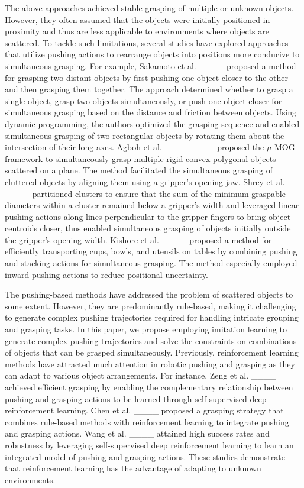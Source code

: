 The above approaches achieved stable grasping of multiple or unknown objects. However, they often assumed that the objects were initially positioned in proximity and thus are less applicable to environments where objects are scattered. To tackle such limitations, several studies have explored approaches that utilize pushing actions to rearrange objects into positions more conducive to simultaneous grasping. For example, Sakamoto et al. ____ proposed a method for grasping two distant objects by first pushing one object closer to the other and then grasping them together. The approach determined whether to grasp a single object, grasp two objects simultaneously, or push one object closer for simultaneous grasping based on the distance and friction between objects. Using dynamic programming, the authors optimized the grasping sequence and enabled simultaneous grasping of two rectangular objects by rotating them about the intersection of their long axes. Agboh et al. ________ proposed the $\mu$-MOG framework to simultaneously grasp multiple rigid convex polygonal objects scattered on a plane. The method facilitated the simultaneous grasping of cluttered objects by aligning them using a gripper's opening jaw. Shrey et al. ____ partitioned clusters to ensure that the sum of the minimum graspable diameters within a cluster remained below a gripper’s width and leveraged linear pushing actions along lines perpendicular to the gripper fingers to bring object centroids closer, thus enabled simultaneous grasping of objects initially outside the gripper's opening width. Kishore et al. ____ proposed a method for efficiently transporting cups, bowls, and utensils on tables by combining pushing and stacking actions for simultaneous grasping. The method especially employed inward-pushing actions to reduce positional uncertainty. 

The pushing-based methods have addressed the problem of scattered objects to some extent. However, they are predominantly rule-based, making it challenging to generate complex pushing trajectories required for handling intricate grouping and grasping tasks. In this paper, we propose employing imitation learning to generate complex pushing trajectories and solve the constraints on combinations of objects that can be grasped simultaneously. Previously, reinforcement learning methods have attracted much attention in robotic pushing and grasping as they can adapt to various object arrangements. For instance, Zeng et al. ____ achieved efficient grasping by enabling the complementary relationship between pushing and grasping actions to be learned through self-supervised deep reinforcement learning. Chen et al. ____ proposed a grasping strategy that combines rule-based methods with reinforcement learning to integrate pushing and grasping actions. Wang et al. ____ attained high success rates and robustness by leveraging self-supervised deep reinforcement learning to learn an integrated model of pushing and grasping actions. These studies demonstrate that reinforcement learning has the advantage of adapting to unknown environments. 

